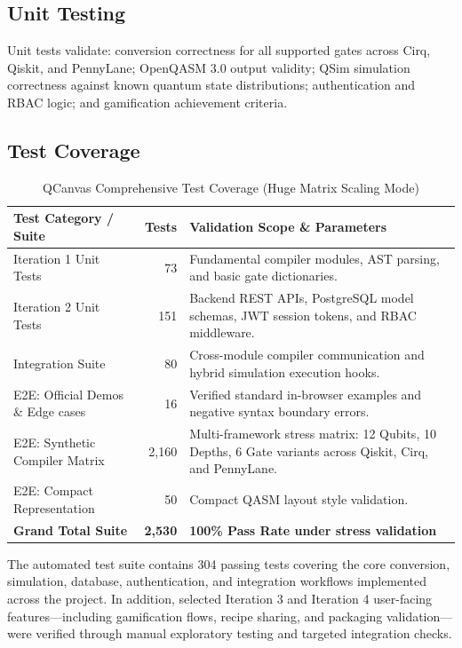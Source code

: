 \subsection{Unit Testing}
Unit tests validate: conversion correctness for all supported gates across Cirq, Qiskit, and PennyLane; OpenQASM 3.0 output validity; QSim simulation correctness against known quantum state distributions; authentication and RBAC logic; and gamification achievement criteria.

\subsection{Test Coverage}

\begin{table}[H]
\centering
\caption{QCanvas Comprehensive Test Coverage (Huge Matrix Scaling Mode)}
\label{tab:huge-test-coverage}
\begin{tabularx}{\linewidth}{l r X}
\toprule
\textbf{Test Category / Suite} & \textbf{Tests} & \textbf{Validation Scope \& Parameters} \\
\midrule
Iteration 1 Unit Tests & 73 & Fundamental compiler modules, AST parsing, and basic gate dictionaries. \\
Iteration 2 Unit Tests & 151 & Backend REST APIs, PostgreSQL model schemas, JWT session tokens, and RBAC middleware. \\
Integration Suite & 80 & Cross-module compiler communication and hybrid simulation execution hooks. \\
E2E: Official Demos \& Edge cases & 16 & Verified standard in-browser examples and negative syntax boundary errors. \\
E2E: Synthetic Compiler Matrix & 2,160 & Multi-framework stress matrix: 12 Qubits, 10 Depths, 6 Gate variants across Qiskit, Cirq, and PennyLane. \\
E2E: Compact Representation & 50 & Compact QASM layout style validation. \\
\midrule
\textbf{Grand Total Suite} & \textbf{2,530} & \textbf{100\% Pass Rate under stress validation} \\
\bottomrule
\end{tabularx}
\end{table}

The automated test suite contains 304 passing tests covering the core conversion, simulation, database, authentication, and integration workflows implemented across the project. In addition, selected Iteration 3 and Iteration 4 user-facing features---including gamification flows, recipe sharing, and packaging validation---were verified through manual exploratory testing and targeted integration checks.


